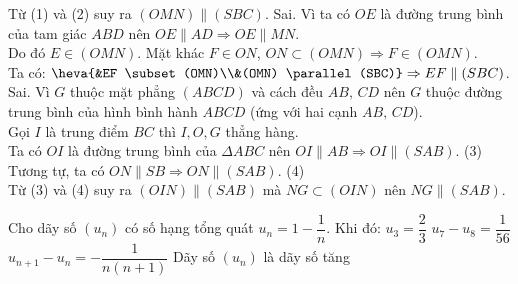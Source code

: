 \begin{ex}
{\begin{itemchoice}
			Từ (1) và (2) suy ra $(OMN) \parallel (SBC)$.
			\itemch Sai. Vì ta có $OE$ là đường trung bình của tam giác $ABD$ nên $OE \parallel AD \Rightarrow OE \parallel MN$.\\
			Do đó $E \in (OMN)$. Mặt khác $F \in ON$, $ON \subset (OMN) \Rightarrow F \in (OMN)$.\\
			Ta có: $\heva{&EF \subset (OMN)\\&(OMN) \parallel (SBC)} \Rightarrow EF \parallel (SBC)$.
			\itemch Sai. Vì $G$ thuộc mặt phẳng $(ABCD)$ và cách đều $AB,\,CD$ nên $G$ thuộc đường trung bình của hình bình hành $ABCD$ (ứng với hai cạnh $AB,\,CD$).\\
			Gọi $I$ là trung điểm $BC$ thì $I,O,G$ thẳng hàng.\\
			Ta có $OI$ là đường trung bình của $\Delta ABC$ nên $OI \parallel AB \Rightarrow OI \parallel (SAB)$. (3)\\
			Tương tự, ta có $ON \parallel SB \Rightarrow ON \parallel (SAB)$. (4)\\
			Từ (3) và (4) suy ra $(OIN) \parallel (SAB)$ mà $NG \subset (OIN)$ nên $NG \parallel (SAB)$.
		\end{itemchoice}
	}
\end{ex}

\begin{ex}%
	Cho dãy số $(u_n)$ có số hạng tổng quát $u_n=1-\dfrac{1}{n}$. Khi đó:
	\choiceTF
	{\True $u_3=\dfrac{2}{3}$}
	{$u_7-u_8=\dfrac{1}{56}$}
	{$u_{n+1}-u_n=-\dfrac{1}{n(n+1)}$}
	{\True Dãy số $(u_n)$ là dãy số tăng}
\end{ex}

